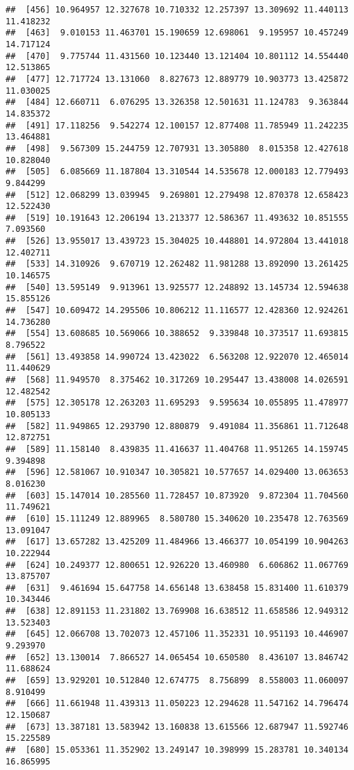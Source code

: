 \documentclass[
]{article}
\begin{document}
\begin{verbatim}
##  [456] 10.964957 12.327678 10.710332 12.257397 13.309692 11.440113 11.418232
##  [463]  9.010153 11.463701 15.190659 12.698061  9.195957 10.457249 14.717124
##  [470]  9.775744 11.431560 10.123440 13.121404 10.801112 14.554440 12.513865
##  [477] 12.717724 13.131060  8.827673 12.889779 10.903773 13.425872 11.030025
##  [484] 12.660711  6.076295 13.326358 12.501631 11.124783  9.363844 14.835372
##  [491] 17.118256  9.542274 12.100157 12.877408 11.785949 11.242235 13.464881
##  [498]  9.567309 15.244759 12.707931 13.305880  8.015358 12.427618 10.828040
##  [505]  6.085669 11.187804 13.310544 14.535678 12.000183 12.779493  9.844299
##  [512] 12.068299 13.039945  9.269801 12.279498 12.870378 12.658423 12.522430
##  [519] 10.191643 12.206194 13.213377 12.586367 11.493632 10.851555  7.093560
##  [526] 13.955017 13.439723 15.304025 10.448801 14.972804 13.441018 12.402711
##  [533] 14.310926  9.670719 12.262482 11.981288 13.892090 13.261425 10.146575
##  [540] 13.595149  9.913961 13.925577 12.248892 13.145734 12.594638 15.855126
##  [547] 10.609472 14.295506 10.806212 11.116577 12.428360 12.924261 14.736280
##  [554] 13.608685 10.569066 10.388652  9.339848 10.373517 11.693815  8.796522
##  [561] 13.493858 14.990724 13.423022  6.563208 12.922070 12.465014 11.440629
##  [568] 11.949570  8.375462 10.317269 10.295447 13.438008 14.026591 12.482542
##  [575] 12.305178 12.263203 11.695293  9.595634 10.055895 11.478977 10.805133
##  [582] 11.949865 12.293790 12.880879  9.491084 11.356861 11.712648 12.872751
##  [589] 11.158140  8.439835 11.416637 11.404768 11.951265 14.159745  9.394898
##  [596] 12.581067 10.910347 10.305821 10.577657 14.029400 13.063653  8.016230
##  [603] 15.147014 10.285560 11.728457 10.873920  9.872304 11.704560 11.749621
##  [610] 15.111249 12.889965  8.580780 15.340620 10.235478 12.763569 13.091047
##  [617] 13.657282 13.425209 11.484966 13.466377 10.054199 10.904263 10.222944
##  [624] 10.249377 12.800651 12.926220 13.460980  6.606862 11.067769 13.875707
##  [631]  9.461694 15.647758 14.656148 13.638458 15.831400 11.610379 10.343446
##  [638] 12.891153 11.231802 13.769908 16.638512 11.658586 12.949312 13.523403
##  [645] 12.066708 13.702073 12.457106 11.352331 10.951193 10.446907  9.293970
##  [652] 13.130014  7.866527 14.065454 10.650580  8.436107 13.846742 11.688624
##  [659] 13.929201 10.512840 12.674775  8.756899  8.558003 11.060097  8.910499
##  [666] 11.661948 11.439313 11.050223 12.294628 11.547162 14.796474 12.150687
##  [673] 13.387181 13.583942 13.160838 13.615566 12.687947 11.592746 15.225589
##  [680] 15.053361 11.352902 13.249147 10.398999 15.283781 10.340134 16.865995

\end{verbatim}
\end{document}
